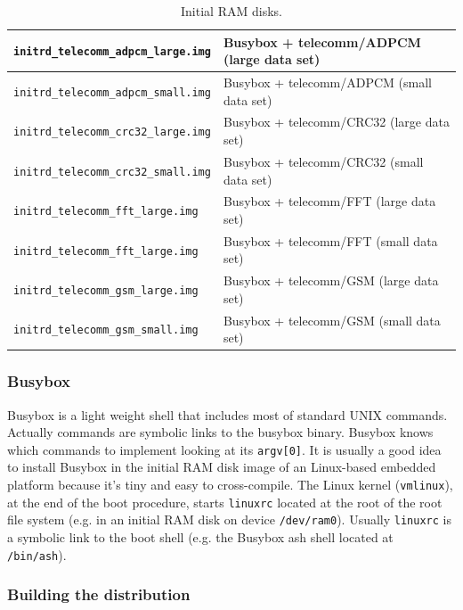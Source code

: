\begin{table}[!h]
\begin{center}
\begin{tabular}{|l|l|}
		\hline
		\texttt{initrd\_telecomm\_adpcm\_large.img} & Busybox + telecomm/ADPCM (large data set)\\
		\hline
		\texttt{initrd\_telecomm\_adpcm\_small.img} & Busybox + telecomm/ADPCM (small data set)\\
		\hline
		\texttt{initrd\_telecomm\_crc32\_large.img} & Busybox + telecomm/CRC32 (large data set)\\
		\hline
		\texttt{initrd\_telecomm\_crc32\_small.img} & Busybox + telecomm/CRC32 (small data set)\\
		\hline
		\texttt{initrd\_telecomm\_fft\_large.img} & Busybox + telecomm/FFT (large data set)\\
		\hline
		\texttt{initrd\_telecomm\_fft\_large.img} & Busybox + telecomm/FFT (small data set)\\
		\hline
		\texttt{initrd\_telecomm\_gsm\_large.img} & Busybox + telecomm/GSM (large data set)\\
		\hline
		\texttt{initrd\_telecomm\_gsm\_small.img} & Busybox + telecomm/GSM (small data set)\\
		\hline
		\end{tabular}
	\end{center}
	\caption{Initial RAM disks.}
	\label{table:initrd}
\end{table}

\cleardoublepage

\subsubsection{Busybox}

Busybox is a light weight shell that includes most of standard UNIX commands. Actually commands are symbolic links to the busybox binary.
Busybox knows which commands to implement looking at its \texttt{argv[0]}.
It is usually a good idea to install Busybox in the initial RAM disk image of an Linux-based embedded platform because it's tiny and easy to cross-compile.
The Linux kernel (\texttt{vmlinux}), at the end of the boot procedure, starts \texttt{linuxrc} located at the root of the root file system (e.g. in an initial RAM disk on device \texttt{/dev/ram0}). Usually \texttt{linuxrc} is a symbolic link to the boot shell (e.g. the Busybox ash shell located at \texttt{/bin/ash}).

\subsubsection{Building the distribution}

